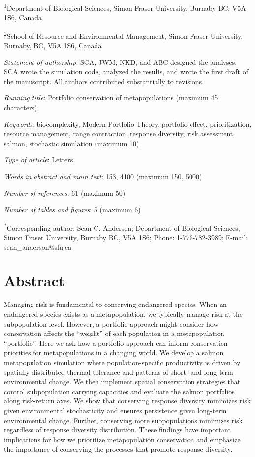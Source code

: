 \textsuperscript{1}Department of Biological Sciences, Simon Fraser University, Burnaby BC, V5A 1S6, Canada

\textsuperscript{2}School of Resource and Environmental Management, Simon Fraser University, Burnaby, BC, V5A 1S6, Canada

\emph{Statement of authorship}: SCA, JWM, NKD, and ABC designed the analyses. SCA wrote the simulation code, analyzed the results, and wrote the first draft of the manuscript. All authors contributed substantially to revisions.

\emph{Running title}: Portfolio conservation of metapopulations (maximum 45 characters)

\emph{Keywords}: biocomplexity, Modern Portfolio Theory, portfolio effect, prioritization, resource management, range contraction, response diversity, risk assessment, salmon, stochastic simulation (maximum 10)

\emph{Type of article}: Letters

\emph{Words in abstract and main text}: 153, 4100 (maximum 150, 5000)

\emph{Number of references}: 61 (maximum 50)

\emph{Number of tables and figures}: 5 (maximum 6)

\textsuperscript{*}Corresponding author: Sean C. Anderson; Department of Biological Sciences, Simon Fraser University, Burnaby BC, V5A 1S6; Phone: 1-778-782-3989; E-mail: sean\_anderson@sfu.ca

\section{Abstract}

Managing risk is fundamental to conserving endangered species. When an endangered species exists as a metapopulation, we typically manage risk at the subpopulation level. However, a portfolio approach might consider how conservation affects the ``weight'' of each population in a metapopulation ``portfolio''. Here we ask how a portfolio approach can inform conservation priorities for metapopulations in a changing world. We develop a salmon metapopulation simulation where population-specific productivity is driven by spatially-distributed thermal tolerance and patterns of short- and long-term environmental change. We then implement spatial conservation strategies that control subpopulation carrying capacities and evaluate the salmon portfolios along risk-return axes. We show that conserving response diversity minimizes risk given environmental stochasticity and ensures persistence given long-term environmental change. Further, conserving more subpopulations minimizes risk regardless of response diversity distribution. These findings have important implications for how we prioritize metapopulation conservation and emphasize the importance of conserving the processes that promote response diversity.

